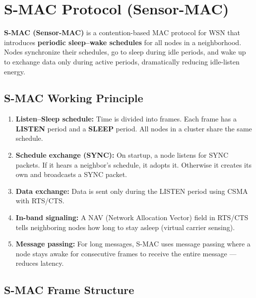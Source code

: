 \documentclass[12pt,a4paper]{article}
\begin{document}
\section{S-MAC Protocol (Sensor-MAC)}

\begin{tcolorbox}[defbox, title={\textbf{S-MAC --- Definition}}]
\textbf{S-MAC (Sensor-MAC)} is a contention-based MAC protocol for WSN that introduces \textbf{periodic sleep--wake schedules} for all nodes in a neighborhood. Nodes synchronize their schedules, go to sleep during idle periods, and wake up to exchange data only during active periods, dramatically reducing idle-listen energy.
\end{tcolorbox}

\subsection{S-MAC Working Principle}

\begin{enumerate}[leftmargin=*, itemsep=4pt]
  \item \textbf{Listen--Sleep schedule:} Time is divided into frames. Each frame has a \textbf{LISTEN} period and a \textbf{SLEEP} period. All nodes in a cluster share the same schedule.
  \item \textbf{Schedule exchange (SYNC):} On startup, a node listens for SYNC packets. If it hears a neighbor's schedule, it adopts it. Otherwise it creates its own and broadcasts a SYNC packet.
  \item \textbf{Data exchange:} Data is sent only during the LISTEN period using CSMA with RTS/CTS.
  \item \textbf{In-band signaling:} A NAV (Network Allocation Vector) field in RTS/CTS tells neighboring nodes how long to stay asleep (virtual carrier sensing).
  \item \textbf{Message passing:} For long messages, S-MAC uses message passing where a node stays awake for consecutive frames to receive the entire message --- reduces latency.
\end{enumerate}

\subsection{S-MAC Frame Structure}
\end{document}

